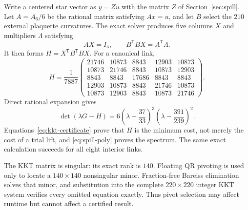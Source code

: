 Write a centered star vector as $y=Zu$ with the matrix $Z$ of
Section~\ref{sec:spill}.  Let $A=A_6/6$ be the rational matrix satisfying
$Ax=u$, and let $B$ select the $210$ external plaquette curvatures.  The exact
solver produces five columns $X$ and multipliers $\Lambda$ satisfying
\begin{equation}
\label{eq:kkt-certificate}
 AX=I_5,
 \qquad B^\mathsf TBX=A^\mathsf T\Lambda.
\end{equation}
It then forms $H=X^\mathsf TB^\mathsf TBX$.  For a canonical link,
\begin{equation}
\label{eq:spill-H}
 H=\frac1{7887}
 \begin{pmatrix}
21746&10873&8843&12903&10873\\
10873&21746&8843&10873&12903\\
8843&8843&17686&8843&8843\\
12903&10873&8843&21746&10873\\
10873&12903&8843&10873&21746
 \end{pmatrix}.
\end{equation}
Direct rational expansion gives
\begin{equation}
\label{eq:spill-poly}
 \det(\lambda G-H)
 =6\left(\lambda-\frac{37}{33}\right)^3
   \left(\lambda-\frac{391}{239}\right)^2.
\end{equation}
Equations~\eqref{eq:kkt-certificate} prove that $H$ is the minimum cost, not
merely the cost of a trial lift, and \eqref{eq:spill-poly} proves the spectrum.
The same exact calculation succeeds for all eight interior links.

The KKT matrix is singular: its exact rank is $140$.  Floating QR pivoting is
used only to locate a $140\times140$ nonsingular minor.  Fraction-free Bareiss
elimination solves that minor, and substitution into the complete
$220\times220$ integer KKT system verifies every omitted equation exactly.
Thus pivot selection may affect runtime but cannot affect a certified result.

